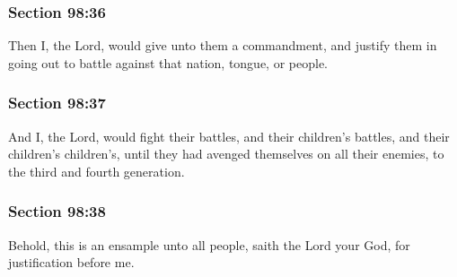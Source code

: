 	\subsubsection{Section 98:36} %
		\label{DC98-36}

		Then I, the Lord, would give unto them a commandment, and justify them in going out to battle against that nation, tongue, or people.


	\subsubsection{Section 98:37} %
		\label{DC98-37}

		And I, the Lord, would fight their battles, and their children's battles, and their children's children's, until they had avenged themselves on all their enemies, to the third and fourth generation.


	\subsubsection{Section 98:38} %
		\label{DC98-38}

		Behold, this is an ensample unto all people, saith the Lord your God, for justification before me.


